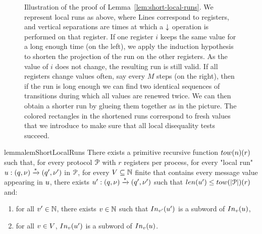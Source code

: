 \begin{figure}
	
	\caption{Illustration of the proof of Lemma~\ref{lem:short-local-runs}. We represent local runs as above, where Lines correspond to registers, and vertical separations are times at which a $\downarrow$ operation is performed on that register. If one register $i$ keeps the same value for a long enough time (on the left), we apply the induction hypothesis to shorten the projection of the run on the other registers. As the value of $i$ does not change, the resulting run is still valid. If all registers change values often, say every $M$ steps (on the right), then if the run is long enough we can find two identical sequences of transitions during which all values are renewed twice. We can then obtain a shorter run by glueing them together as in the picture. The colored rectangles in the shortened runs correspond to fresh values that we introduce to make sure that all local disequality tests succeed.}
\end{figure}
\begin{restatable}{lemma}{lemShortLocalRuns}
	\label{lem:short-local-runs}
	There exists a primitive recursive function $\towerfun(n) (\regnum)$ such that, for every protocol $\mathcal{P}$ with $r$ registers per process, for every "local run" $u: (q, \nu) \xrightarrow{*} (q', \nu')$ in $\mathcal{P}$, for every $V \subseteq \mathbb{N}$ finite that contains every message value appearing in $u$, there exists $u': (q, \nu) \xrightarrow{*} (q', \nu')$ such that $\length{\localrun'} \leq \towerfun(\size{\prot})(r)$ and:
	\begin{enumerate}
		\item \label{item:shorterrun_anyvalue} for all $v' \in \mathbb{N}$, there exists $v \in \mathbb{N}$ such that $\vinput{\aval'}{\localrun'}$ is a subword of $\vinput{\aval}{\localrun}$,
		\item \label{item:shorterrun_oldvalues} for all $v \in V$, $\vinput{\aval}{\localrun'}$ is a subword of $\vinput{\aval}{\localrun}$. 
	\end{enumerate}
\end{restatable}


